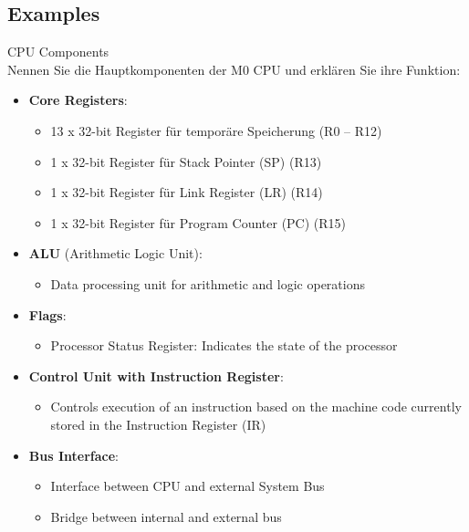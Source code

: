 \subsection{Examples}

\begin{example2}{CPU Components}\\
Nennen Sie die Hauptkomponenten der M0 CPU und erklären Sie ihre Funktion:
\begin{itemize}
  \item \textbf{Core Registers}:
    \begin{itemize}
      \item 13 x 32-bit Register für temporäre Speicherung (R0 – R12)
      \item 1 x 32-bit Register für Stack Pointer (SP) (R13)
      \item 1 x 32-bit Register für Link Register (LR) (R14)
      \item 1 x 32-bit Register für Program Counter (PC) (R15)
    \end{itemize}
  \item \textbf{ALU} (Arithmetic Logic Unit):
    \begin{itemize}
      \item Data processing unit for arithmetic and logic operations
    \end{itemize}
  \item \textbf{Flags}:
    \begin{itemize}
      \item Processor Status Register: Indicates the state of the processor
    \end{itemize}
  \item \textbf{Control Unit with Instruction Register}:
    \begin{itemize}
      \item Controls execution of an instruction based on the machine code currently stored in the Instruction Register (IR)
    \end{itemize}
  \item \textbf{Bus Interface}:
    \begin{itemize}
      \item Interface between CPU and external System Bus
      \item Bridge between internal and external bus
    \end{itemize}
\end{itemize}
\end{example2}

